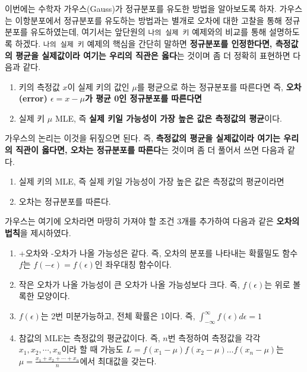 \documentclass[]{book}
\providecommand{\tightlist}{%
  \setlength{\itemsep}{0pt}\setlength{\parskip}{0pt}}
\begin{document}
이번에는 수학자 가우스(Gauss)가 정규분포를 유도한 방법을 알아보도록
하자. 가우스는 이항분포에서 정규분포를 유도하는 방법과는 별개로 오차에
대한 고찰을 통해 정규분포를 유도하였는데, 여기서는 앞단원의
\texttt{나의\ 실제\ 키} 예제와의 비교를 통해 설명하도록 하겠다.
\texttt{나의\ 실제\ 키} 예제의 핵심을 간단히 말하면 \textbf{정규분포를
인정한다면, 측정값의 평균을 실제값이라 여기는 우리의 직관은 옳다}는
것이며 좀 더 정확히 표현하면 다음과 같다.

\begin{enumerate}
\def\labelenumi{\arabic{enumi}.}
\tightlist
\item
  키의 측정값 \(x\)이 실제 키의 값인 \(\mu\)를 평균으로 하는 정규분포를
  따른다면 즉, \textbf{오차(error) \(\epsilon=x-\mu\)가 평균 0인
  정규분포를 따른다면}
\item
  실제 키 \(\mu\) MLE, 즉 \textbf{실제 키일 가능성이 가장 높은 값은
  측정값의 평균}이다.
\end{enumerate}

가우스의 논리는 이것을 뒤짚으면 된다. 즉, \textbf{측정값의 평균을
실제값이라 여기는 우리의 직관이 옳다면, 오차는 정규분포를 따른다}는
것이며 좀 더 풀어서 쓰면 다음과 같다.

\begin{enumerate}
\def\labelenumi{\arabic{enumi}.}
\tightlist
\item
  실제 키의 MLE, 즉 실제 키일 가능성이 가장 높은 값은 측정값의
  평균이라면
\item
  오차는 정규분포를 따른다.
\end{enumerate}

가우스는 여기에 오차라면 마땅히 가져야 할 조건 3개를 추가하여 다음과
같은 \textbf{오차의 법칙}을 제시하였다.

\begin{enumerate}
\def\labelenumi{\arabic{enumi}.}
\tightlist
\item
  +오차와 -오차가 나올 가능성은 같다. 즉, 오차의 분포를 나타내는
  확률밀도 함수 \(f\)는 \(f(-\epsilon)=f(\epsilon)\)인 좌우대칭
  함수이다.\\
\item
  작은 오차가 나올 가능성이 큰 오차가 나올 가능성보다 크다. 즉,
  \(f(\epsilon)\)는 위로 볼록한 모양이다.
\item
  \(f(\epsilon)\)는 2번 미분가능하고, 전체 확률은 1이다. 즉,
  \(\int_{-\infty}^{\infty} f(\epsilon) d\epsilon=1\)
\item
  참값의 MLE는 측정값의 평균값이다. 즉, \(n\)번 측정하여 측정값을 각각
  \(x_1, x_2, \cdots, x_n\)이라 할 때 가능도
  \(L=f(x_1-\mu)f(x_2-\mu)\dots f(x_n-\mu)\)는
  \(\mu=\frac{x_1+x_2+\cdots+x_n}{n}\)에서 최대값을 갖는다.
\end{enumerate}
\end{document}
